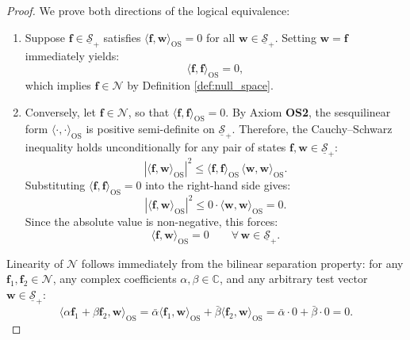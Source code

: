\begin{proof}
We prove both directions of the logical equivalence:
\begin{enumerate}
    \item[($\Leftarrow$)] Suppose $\mathbf{f} \in \underline{\mathcal{S}}_+$ satisfies $\langle \mathbf{f}, \mathbf{w} \rangle_{\mathrm{OS}} = 0$ for all $\mathbf{w} \in \underline{\mathcal{S}}_+$. Setting $\mathbf{w} = \mathbf{f}$ immediately yields:
    \begin{equation}
    \langle \mathbf{f}, \mathbf{f} \rangle_{\mathrm{OS}} = 0,
    \end{equation}
    which implies $\mathbf{f} \in \mathcal{N}$ by Definition \ref{def:null_space}.

    \item[($\Rightarrow$)] Conversely, let $\mathbf{f} \in \mathcal{N}$, so that $\langle \mathbf{f}, \mathbf{f} \rangle_{\mathrm{OS}} = 0$. By Axiom \textbf{OS2}, the sesquilinear form $\langle \cdot, \cdot \rangle_{\mathrm{OS}}$ is positive semi-definite on $\underline{\mathcal{S}}_+$. Therefore, the Cauchy--Schwarz inequality holds unconditionally for any pair of states $\mathbf{f}, \mathbf{w} \in \underline{\mathcal{S}}_+$:
    \begin{equation}
    \left| \langle \mathbf{f}, \mathbf{w} \rangle_{\mathrm{OS}} \right|^2 \le \langle \mathbf{f}, \mathbf{f} \rangle_{\mathrm{OS}} \, \langle \mathbf{w}, \mathbf{w} \rangle_{\mathrm{OS}}.
    \end{equation}
    Substituting $\langle \mathbf{f}, \mathbf{f} \rangle_{\mathrm{OS}} = 0$ into the right-hand side gives:
    \begin{equation}
    \left| \langle \mathbf{f}, \mathbf{w} \rangle_{\mathrm{OS}} \right|^2 \le 0 \cdot \langle \mathbf{w}, \mathbf{w} \rangle_{\mathrm{OS}} = 0.
    \end{equation}
    Since the absolute value is non-negative, this forces:
    \begin{equation}
    \langle \mathbf{f}, \mathbf{w} \rangle_{\mathrm{OS}} = 0 \qquad \forall \, \mathbf{w} \in \underline{\mathcal{S}}_+.
    \end{equation}
\end{enumerate}
Linearity of $\mathcal{N}$ follows immediately from the bilinear separation property: for any $\mathbf{f}_1, \mathbf{f}_2 \in \mathcal{N}$, any complex coefficients $\alpha, \beta \in \mathbb{C}$, and any arbitrary test vector $\mathbf{w} \in \underline{\mathcal{S}}_+$:
\begin{equation}
\langle \alpha \mathbf{f}_1 + \beta \mathbf{f}_2, \mathbf{w} \rangle_{\mathrm{OS}} = \bar{\alpha} \langle \mathbf{f}_1, \mathbf{w} \rangle_{\mathrm{OS}} + \bar{\beta} \langle \mathbf{f}_2, \mathbf{w} \rangle_{\mathrm{OS}} = \bar{\alpha} \cdot 0 + \bar{\beta} \cdot 0 = 0.

\end{equation}
\end{proof}
